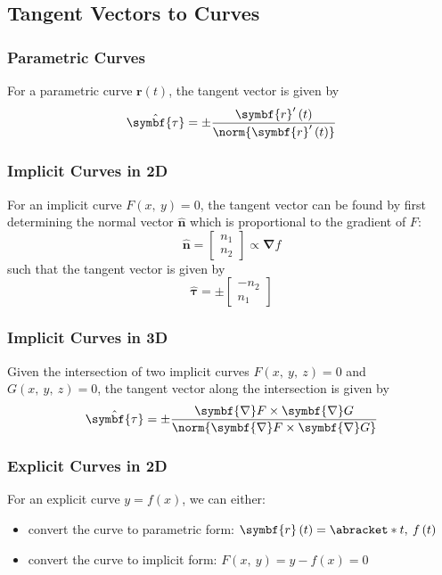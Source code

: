 \documentclass{article}
\begin{document}
\subsection{Tangent Vectors to Curves}
\subsubsection{Parametric Curves}
For a parametric curve \(\symbf{r}\left( t \right)\), the tangent
vector is given by
\begin{equation*}
    \hat{\symbf{\tau}} = \pm \frac{\symbf{r}'\left( t \right)}{\norm{\symbf{r}'\left( t \right)}}
\end{equation*}
\subsubsection{Implicit Curves in 2D}
For an implicit curve \(F\left( x,\: y \right) = 0\), the tangent
vector can be found by first determining the normal vector
\(\hat{\symbf{n}}\) which is proportional to the gradient of \(F\):
\begin{equation*}
    \hat{\symbf{n}} =
    \begin{bmatrix}
        n_1 \\
        n_2
    \end{bmatrix}
    \propto \symbf{\nabla} f
\end{equation*}
such that the tangent vector is given by
\begin{equation*}
    \hat{\symbf{\tau}} = \pm
    \begin{bmatrix}
        -n_2 \\
        n_1
    \end{bmatrix}
\end{equation*}
\subsubsection{Implicit Curves in 3D}
Given the intersection of two implicit curves \(F\left( x,\: y,\: z
\right) = 0\) and \(G\left( x,\: y,\: z \right) = 0\), the tangent
vector along the intersection is given by
\begin{equation*}
    \hat{\symbf{\tau}} = \pm \frac{\symbf{\nabla} F \times \symbf{\nabla} G}{\norm{\symbf{\nabla} F \times \symbf{\nabla} G}}
\end{equation*}
\subsubsection{Explicit Curves in 2D}
For an explicit curve \(y = f\left( x \right)\), we can either:
\begin{itemize}
    \item convert the curve to parametric form: \(\symbf{r}\left( t
          \right) = \abracket*{t,\: f\left( t \right)}\)
    \item convert the curve to implicit form: \(F\left( x,\: y \right)
          = y - f\left( x \right) = 0\)
\end{itemize}
\end{document}
